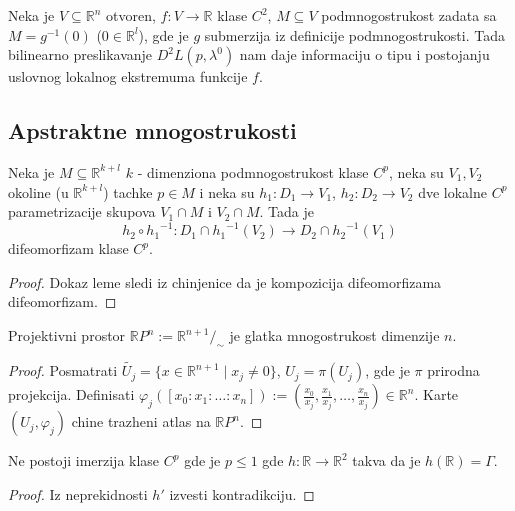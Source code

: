 \documentclass[a4paper,12pt]{article}
\newcommand{\RR}{\mathbb{R}}
\newcommand{\psj}{\subseteq}
\begin{document}
\begin{tma}
	Neka je $V\psj \RR^n$ otvoren, $f:V\to \RR$ klase $C^2$, $M\psj V$ podmnogostrukost zadata sa $M = g^{-1}(0)$ ($0\in \RR^l$), 
	gde je $g$ submerzija iz definicije podmnogostrukosti. Tada bilinearno preslikavanje $D^2L(p, \lambda^0)$ nam daje informaciju
	o tipu i postojanju uslovnog lokalnog ekstremuma funkcije $f$.
\end{tma}

\subsection{Apstraktne mnogostrukosti}

\begin{lema}
Neka je $M \subseteq \RR^{k+l}$ $k$ - dimenziona podmnogostrukost klase $C^p$, neka su $V_1, V_2$ okoline (u $\RR^{k+l}$) tachke $p \in M$ i neka su $h_1 : D_1 \to V_1$, $h_2: D_2 \to V_2$ dve lokalne $C^p$ parametrizacije skupova $V_1 \cap M$ i $V_2 \cap M$. Tada je
\[h_2 \circ {h_1}^{-1} : D_1 \cap {h_1}^{-1}(V_2) \to D_2 \cap {h_2}^{-1}(V_1)\]
difeomorfizam klase $C^p$.
\end{lema}
\begin{proof}
Dokaz leme sledi iz chinjenice da je kompozicija difeomorfizama difeomor\-fizam.
\end{proof}

\begin{tvr}
	Projektivni prostor $\RR P^n := \RR^{n+1}/_{\sim}$ je glatka mnogostrukost dimenzije $n$.
\end{tvr}
\begin{proof}
	Posmatrati $\widetilde{U_j} = \{x \in \RR^{n+1} \mid x_j \neq 0\}$, $U_j = \pi(U_j)$, gde je $\pi$ prirodna projekcija. Definisati
	$\varphi_j([x_0:x_1:\dotso:x_n]) := (\frac{x_0}{x_j},\frac{x_1}{x_j}, \dotso, \frac{x_n}{x_j}) \in \RR^n$. Karte $(U_j, \varphi_j)$
	chine trazheni atlas na $\RR P^n$.
\end{proof}

\begin{tvr}
Ne postoji imerzija klase $C^p$ gde je $p \leq 1$ gde $h: \RR \to \RR^2$ takva da je $h(\RR) = \Gamma$.
\end{tvr}
\begin{proof}
Iz neprekidnosti $h'$ izvesti kontradikciju.
\end{proof}
\end{document}
